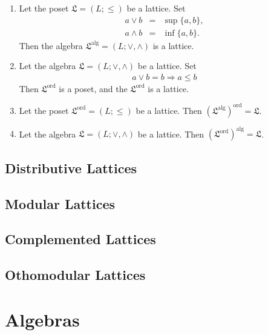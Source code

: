\begin{theorem}
    \begin{enumerate}[label=(\alph*)]
        \item Let the poset \(\mathfrak{L} =(L;\le)\) be a lattice. Set
        \begin{eqnarray*}
            a \vee b &=& \sup\{a,b\}, \\
            a \wedge b &=& \inf \{a,b\}.
        \end{eqnarray*}
        Then the algebra \(\mathfrak{L}^{\mathrm{alg}}=(L;\vee,\wedge)\) is a lattice.

        \item Let the algebra \(\mathfrak{L} = (L;\vee,\wedge) \) be a lattice. Set
        \begin{eqnarray*}
            a \vee b = b \Rightarrow a \le b
        \end{eqnarray*}
        Then \(\mathfrak{L}^{\mathrm{ord}}\) is a poset, and the \(\mathfrak{L}^{\mathrm{ord}}\) is a lattice.

        \item Let the poset \(\mathfrak{L}^{\mathrm{ord}}=(L;\le)\) be a lattice. Then \((\mathfrak{L}^{\mathrm{alg}})^{\mathrm{ord}}=\mathfrak{L}\).
        
        \item Let the algebra \(\mathfrak{L}=(L;\vee,\wedge)\) be a lattice. Then \((\mathfrak{L}^{\mathrm{ord}})^\mathrm{alg}=\mathfrak{L}\).
    \end{enumerate}

\section{Distributive Lattices}

\section{Modular Lattices}

\section{Complemented Lattices}

\section{Othomodular Lattices}

\chapter{Algebras}

\end{theorem}
